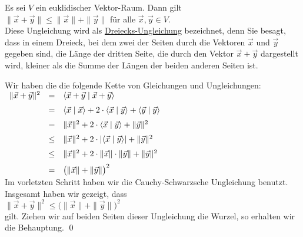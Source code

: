 \begin{Satz} 
   Es sei $V$ ein euklidischer Vektor-Raum.  Dann gilt
   \\[0.2cm]
   \hspace*{1.3cm}
   $\|\vec{x}+\vec{y}\| \leq \|\vec{x}\| + \|\vec{y}\|$ \quad f\"{u}r alle $\vec{x}, \vec{y} \in V$.  
   \\[0.2cm]
   Diese Ungleichung wird als
   \href{https://de.wikipedia.org/wiki/Dreiecksungleichung}{Dreiecks-Ungleichung} bezeichnet, denn
   Sie besagt,  dass in einem Dreieck, bei dem zwei der Seiten durch die Vektoren $\vec{x}$ und $\vec{y}$ gegeben
   sind, die L\"{a}nge der dritten Seite, die durch den Vektor $\vec{x} + \vec{y}$ dargestellt wird, 
   kleiner als die Summe der L\"{a}ngen der beiden anderen Seiten ist.
\end{Satz}

\proof
Wir haben die die folgende Kette von Gleichungen und Ungleichungen:
\\[0.2cm]
\hspace*{1.3cm}
$
\begin{array}[t]{lcll}
  \|\vec{x} + \vec{y}\|^2 & = & \langle \vec{x} + \vec{y} \mid  \vec{x} + \vec{y} \rangle \\[0.2cm]
                          & = & \langle \vec{x} \mid \vec{x} \rangle + 
                                2 \cdot \langle \vec{x} \mid \vec{y} \rangle + 
                                \langle \vec{y} \mid \vec{y} \rangle \\[0.2cm]
                          & = & \|\vec{x}\|^2 + 2 \cdot \langle \vec{x} \mid \vec{y} \rangle + \|\vec{y}\|^2 \\[0.2cm]
                          & \leq & \|\vec{x}\|^2 + 2 \cdot |\langle \vec{x} \mid \vec{y} \rangle| + \|\vec{y}\|^2 \\[0.2cm]
                          & \leq & \|\vec{x}\|^2 + 2 \cdot \|\vec{x}\| \cdot \|\vec{y}\| + \|\vec{y}\|^2 \\[0.2cm]
                          & = & \bigl(\|\vec{x}\| + \|\vec{y}\|\bigr)^2 
\end{array}
$
\\[0.2cm]
Im vorletzten Schritt haben wir die Cauchy-Schwarzsche Ungleichung benutzt.  Insgesamt haben wir
gezeigt, dass
\\[0.2cm]
\hspace*{1.3cm}
$\|\vec{x} + \vec{y}\|^2 \leq \bigl(\|\vec{x}\| + \|\vec{y}\|\bigr)^2$
\\[0.2cm] 
gilt.  Ziehen wir auf beiden Seiten dieser Ungleichung die Wurzel, so erhalten wir die Behauptung.  
\qed

